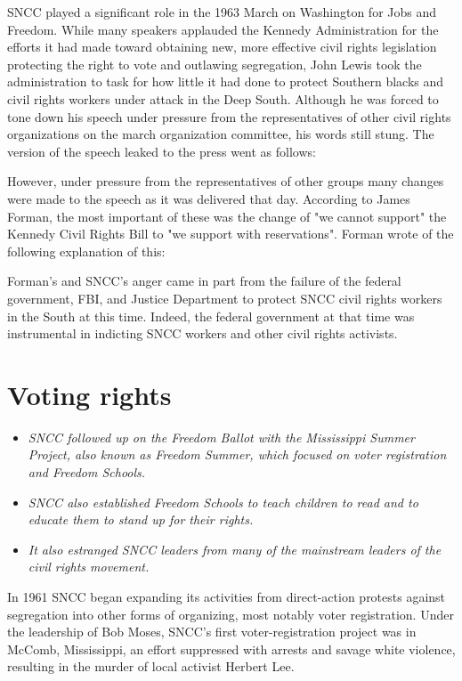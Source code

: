 SNCC played a significant role in the 1963 March on Washington for Jobs
and Freedom. While many speakers applauded the Kennedy Administration
for the efforts it had made toward obtaining new, more effective civil
rights legislation protecting the right to vote and outlawing
segregation, John Lewis took the administration to task for how little
it had done to protect Southern blacks and civil rights workers under
attack in the Deep South. Although he was forced to tone down his speech
under pressure from the representatives of other civil rights
organizations on the march organization committee, his words still
stung. The version of the speech leaked to the press went as follows:

However, under pressure from the representatives of other groups many
changes were made to the speech as it was delivered that day. According
to James Forman, the most important of these was the change of "we
cannot support" the Kennedy Civil Rights Bill to "we support with
reservations". Forman wrote of the following explanation of this:

Forman's and SNCC's anger came in part from the failure of the federal
government, FBI, and Justice Department to protect SNCC civil rights
workers in the South at this time. Indeed, the federal government at
that time was instrumental in indicting SNCC workers and other civil
rights activists.

\section{Voting rights}\label{voting-rights}

\begin{itemize}
\item
  \emph{SNCC followed up on the Freedom Ballot with the Mississippi
  Summer Project, also known as Freedom Summer, which focused on voter
  registration and Freedom Schools.}
\item
  \emph{SNCC also established Freedom Schools to teach children to read
  and to educate them to stand up for their rights.}
\item
  \emph{It also estranged SNCC leaders from many of the mainstream
  leaders of the civil rights movement.}
\end{itemize}

In 1961 SNCC began expanding its activities from direct-action protests
against segregation into other forms of organizing, most notably voter
registration. Under the leadership of Bob Moses, SNCC's first
voter-registration project was in McComb, Mississippi, an effort
suppressed with arrests and savage white violence, resulting in the
murder of local activist Herbert Lee.

